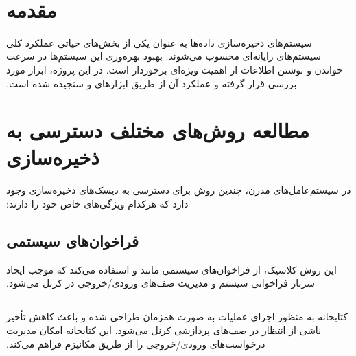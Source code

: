 ‫
‫%
‫%
‫%
‫
‫ %
‫ %
‫
‫\section{مقدمه}
‫سیستم‌های ذخیره‌سازی داده‌ها به عنوان یکی از بخش‌های حیاتی عملکرد کلی سیستم‌های رایانه‌ای محسوب می‌شوند. بهبود بهره‌وری این سیستم‌ها در سرعت خواندن و نوشتن اطلاعات از اهمیت ویژه‌ای برخوردار است. در این پروژه، ابزار  مورد بررسی قرار گرفته و عملکرد آن از طریق ابزارهای  و  سنجیده شده است.
‫
‫\section*{مطالعه روش‌های مختلف دسترسی به ذخیره‌سازی}
‫در سیستم‌عامل‌های مدرن، چندین روش برای دسترسی به دیسک‌های ذخیره‌سازی وجود دارد که هرکدام ویژگی‌های خاص خود را دارند:
‫
‫\subsection*{فراخوان‌های سیستمی }
‫این روش کلاسیک، از فراخوان‌های سیستمی مانند  و  استفاده می‌کند که موجب ایجاد سربار فراخوانی سیستم و مدیریت صف‌های ورودی/خروجی در کرنل می‌شود.
‫
‫\subsection*{}
‫کتابخانه  به منظور اجرای عملیات  به صورت همزمان طراحی شده و باعث کاهش تأخیر ناشی از انتظار در صف‌های پردازشی کرنل می‌شود. این کتابخانه امکان مدیریت درخواست‌های ورودی/خروجی را از طریق مکانیزم  فراهم می‌کند.
